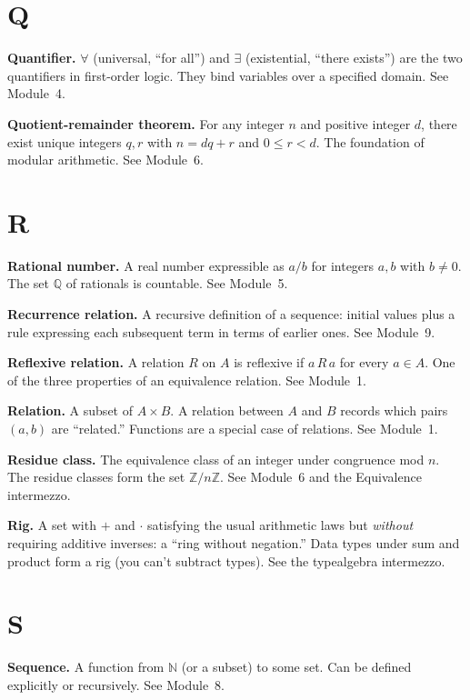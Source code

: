 \documentclass[11pt]{article}
\begin{document}
\section*{Q}

\textbf{Quantifier.} $\forall$ (universal, ``for all'') and $\exists$ (existential, ``there exists'') are the two quantifiers in first-order logic. They bind variables over a specified domain. See Module~4.

\textbf{Quotient-remainder theorem.} For any integer $n$ and positive integer $d$, there exist unique integers $q, r$ with $n = dq + r$ and $0 \leq r < d$. The foundation of modular arithmetic. See Module~6.

\section*{R}

\textbf{Rational number.} A real number expressible as $a/b$ for integers $a, b$ with $b \neq 0$. The set $\mathbb{Q}$ of rationals is countable. See Module~5.

\textbf{Recurrence relation.} A recursive definition of a sequence: initial values plus a rule expressing each subsequent term in terms of earlier ones. See Module~9.

\textbf{Reflexive relation.} A relation $R$ on $A$ is reflexive if $a \, R \, a$ for every $a \in A$. One of the three properties of an equivalence relation. See Module~1.

\textbf{Relation.} A subset of $A \times B$. A relation between $A$ and $B$ records which pairs $(a, b)$ are ``related.'' Functions are a special case of relations. See Module~1.

\textbf{Residue class.} The equivalence class of an integer under congruence mod $n$. The residue classes form the set $\mathbb{Z}/n\mathbb{Z}$. See Module~6 and the Equivalence intermezzo.

\textbf{Rig.} A set with $+$ and $\cdot$ satisfying the usual arithmetic laws but \emph{without} requiring additive inverses: a ``ring without negation.'' Data types under sum and product form a rig (you can't subtract types). See the typealgebra intermezzo.

\section*{S}

\textbf{Sequence.} A function from $\mathbb{N}$ (or a subset) to some set. Can be defined explicitly or recursively. See Module~8.
\end{document}
